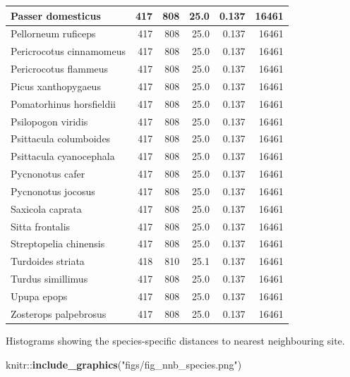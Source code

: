 \documentclass[]{article}
\newenvironment{Shaded}{}{}
\newcommand{\KeywordTok}[1]{\textcolor[rgb]{0.00,0.44,0.13}{\textbf{#1}}}
\newcommand{\NormalTok}[1]{#1}
\newcommand{\OperatorTok}[1]{\textcolor[rgb]{0.40,0.40,0.40}{#1}}
\newcommand{\StringTok}[1]{\textcolor[rgb]{0.25,0.44,0.63}{#1}}
\begin{document}
\begin{tabular}{l|r|r|r|r|r}
\hline
Passer domesticus & 417 & 808 & 25.0 & 0.137 & 16461\\
\hline
Pellorneum ruficeps & 417 & 808 & 25.0 & 0.137 & 16461\\
\hline
Pericrocotus cinnamomeus & 417 & 808 & 25.0 & 0.137 & 16461\\
\hline
Pericrocotus flammeus & 417 & 808 & 25.0 & 0.137 & 16461\\
\hline
Picus xanthopygaeus & 417 & 808 & 25.0 & 0.137 & 16461\\
\hline
Pomatorhinus horsfieldii & 417 & 808 & 25.0 & 0.137 & 16461\\
\hline
Psilopogon viridis & 417 & 808 & 25.0 & 0.137 & 16461\\
\hline
Psittacula columboides & 417 & 808 & 25.0 & 0.137 & 16461\\
\hline
Psittacula cyanocephala & 417 & 808 & 25.0 & 0.137 & 16461\\
\hline
Pycnonotus cafer & 417 & 808 & 25.0 & 0.137 & 16461\\
\hline
Pycnonotus jocosus & 417 & 808 & 25.0 & 0.137 & 16461\\
\hline
Saxicola caprata & 417 & 808 & 25.0 & 0.137 & 16461\\
\hline
Sitta frontalis & 417 & 808 & 25.0 & 0.137 & 16461\\
\hline
Streptopelia chinensis & 417 & 808 & 25.0 & 0.137 & 16461\\
\hline
Turdoides striata & 418 & 810 & 25.1 & 0.137 & 16461\\
\hline
Turdus simillimus & 417 & 808 & 25.0 & 0.137 & 16461\\
\hline
Upupa epops & 417 & 808 & 25.0 & 0.137 & 16461\\
\hline
Zosterops palpebrosus & 417 & 808 & 25.0 & 0.137 & 16461\\
\hline
\end{tabular}

Histograms showing the species-specific distances to nearest neighbouring site.

\begin{Shaded}
\begin{Highlighting}[]
\NormalTok{knitr}\OperatorTok{::}\KeywordTok{include_graphics}\NormalTok{(}\StringTok{"figs/fig_nnb_species.png"}\NormalTok{)}
\end{Highlighting}
\end{Shaded}
\end{document}
